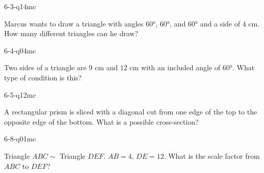 \begin{practiceQuestion}{6-3-q14}{mc}
\begin{questionText}
Marcus wants to draw a triangle with angles $60°$, $60°$, and $60°$ and a side of $4$ cm. How many different triangles can he draw?
\end{questionText}
\end{practiceQuestion}

\begin{practiceQuestion}{6-4-q04}{mc}
\begin{questionText}
Two sides of a triangle are $9$ cm and $12$ cm with an included angle of $60°$. What type of condition is this?
\end{questionText}
\end{practiceQuestion}

\begin{practiceQuestion}{6-5-q12}{mc}
\begin{questionText}
A rectangular prism is sliced with a diagonal cut from one edge of the top to the opposite edge of the bottom. What is a possible cross-section?
\end{questionText}
\end{practiceQuestion}

\begin{practiceQuestion}{6-8-q01}{mc}
\begin{questionText}
Triangle $ABC \sim$ Triangle $DEF$. $AB = 4$, $DE = 12$. What is the scale factor from $ABC$ to $DEF$?
\end{questionText}
\end{practiceQuestion}

